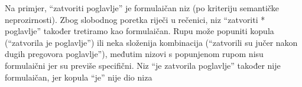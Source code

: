 \documentclass[12pt]{article}
\begin{document}
Na primjer, ``zatvoriti poglavlje'' je formulaičan niz (po kriteriju semantičke neprozirnosti). Zbog slobodnog
poretka riječi u rečenici, niz ``zatvoriti * poglavlje'' također tretiramo kao formulaičan. Rupu može popuniti
kopula (``zatvorila je poglavlje'') ili neka složenija kombinacija (``zatvorili su jučer nakon dugih pregovora
poglavlje''), međutim nizovi s popunjenom rupom nisu formulaični jer su previše specifični. Niz ``je zatvorila
poglavlje'' također nije formulaičan, jer kopula ``je'' nije dio niza
\end{document}
